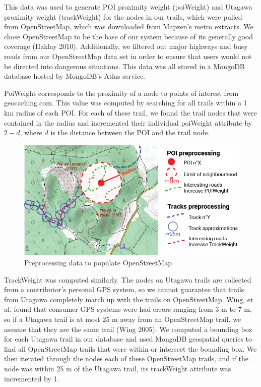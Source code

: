 \documentclass[sigconf]{acmart}
\begin{document}
This data was used to generate POI proximity weight (poiWeight) and Utagawa proximity weight (trackWeight) for the nodes in our trails, which were pulled from OpenStreetMap, which was downloaded from Mapzen's metro extracts. We chose OpenStreetMap to be the base of our system because of its generally good coverage (Haklay 2010). Additionally, we filtered out major highways and busy roads from our OpenStreetMap data set in order to ensure that users would not be directed into dangerous situations. This data was all stored in a MongoDB database hosted by MongoDB's Atlas service.

PoiWeight corresponds to the proximity of a node to points of interest from geocaching.com. This value was computed by searching for all trails within a 1 km radius of each POI. For each of these trail, we found the trail nodes that were contained in the radius and incremented their individual poiWeight attribute by $2 -d$, where $d$ is the distance between the POI and the trail node.

\begin{figure}[htbp]
  \centering
  \includegraphics[width=\columnwidth]{prepro.png}
  \caption{Preprocessing data to populate OpenStreetMap}
\end{figure}

TrackWeight was computed similarly. The nodes on Utagawa trails are collected from a contributor's personal GPS system, so we cannot guarantee that trails from Utagawa completely match up with the trails on OpenStreetMap. Wing, et al. found that consumer GPS systems were had errors ranging from 3 m to 7 m, so if a Utagawa trail is at most 25 m away from an OpenStreetMap trail, we assume that they are the same trail (Wing 2005). We computed a bounding box for each Utagawa trail in our database and used MongoDB geospatial queries to find all OpenStreetMap trails that were within or intersect the bounding box. We then iterated through the nodes each of these OpenStreetMap trails, and if the node was within 25 m of the Utagawa trail, its trackWeight attribute was incremented by 1. 
\end{document}
